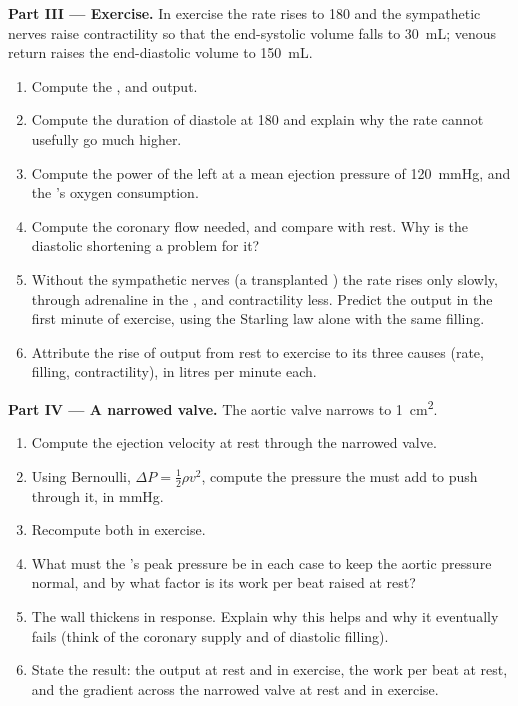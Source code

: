 \begin{problem}
\medskip
\noindent\textbf{Part III --- Exercise.}
In exercise the rate rises to 180 and the sympathetic nerves raise
contractility so that the end-systolic volume falls to
\qty{30}{mL}; venous return raises the end-diastolic volume to
\qty{150}{mL}.
\begin{enumerate}[resume]
  \item Compute the ,  and output.
  \item Compute the duration of diastole at 180 and explain why the
        rate cannot usefully go much higher.
  \item Compute the power of the left  at a mean ejection
        pressure of \qty{120}{mmHg}, and the 's oxygen
        consumption.
  \item Compute the coronary flow needed, and compare with rest.
        Why is the diastolic shortening a problem for it?
  \item Without the sympathetic nerves (a transplanted ) the
        rate rises only slowly, through adrenaline in the , and
        contractility less. Predict the output in the first minute
        of exercise, using the Starling law alone with the same
        filling.
  \item Attribute the rise of output from rest to exercise to its
        three causes (rate, filling, contractility), in litres per
        minute each.
\end{enumerate}

\medskip
\noindent\textbf{Part IV --- A narrowed valve.}
The aortic valve narrows to \qty{1}{cm^2}.
\begin{enumerate}[resume]
  \item Compute the ejection velocity at rest through the narrowed
        valve.
  \item Using Bernoulli, $\Delta P = \tfrac12\rho v^{2}$, compute the
        pressure the  must add to push  through it, in
        mmHg.
  \item Recompute both in exercise.
  \item What must the 's peak pressure be in each case to
        keep the aortic pressure normal, and by what factor is its
        work per beat raised at rest?
  \item The  wall thickens in response. Explain why this
        helps and why it eventually fails (think of the coronary
        supply and of diastolic filling).
  \item State the result: the output at rest and in exercise, the
        work per beat at rest, and the gradient across the narrowed
        valve at rest and in exercise.
\end{enumerate}
\end{problem}
